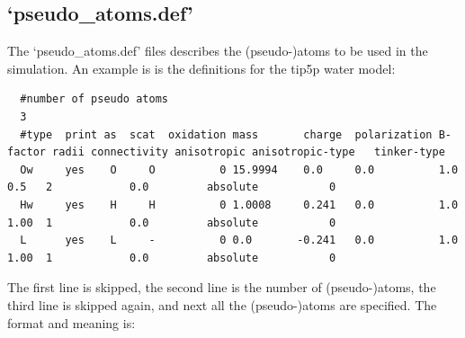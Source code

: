 \subsection{`pseudo\_atoms.def'}

The `pseudo\_atoms.def' files describes the (pseudo-)atoms to be used in the simulation. An example is
is the definitions for the tip5p water model:
\begin{scriptsize}
\begin{verbatim}
  #number of pseudo atoms
  3
  #type  print as  scat  oxidation mass       charge  polarization B-factor radii connectivity anisotropic anisotropic-type   tinker-type
  Ow     yes    O     O          0 15.9994    0.0     0.0          1.0      0.5   2            0.0         absolute           0
  Hw     yes    H     H          0 1.0008     0.241   0.0          1.0      1.00  1            0.0         absolute           0
  L      yes    L     -          0 0.0       -0.241   0.0          1.0      1.00  1            0.0         absolute           0
\end{verbatim}
\end{scriptsize}
The first line is skipped, the second line is the number of (pseudo-)atoms, the third line is skipped again, and next
all the (pseudo-)atoms are specified. The format and meaning is:

